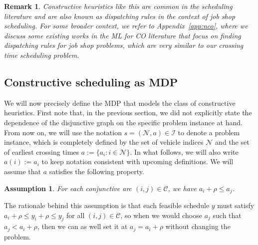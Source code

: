 \documentclass[a4paper]{report}
\theoremstyle{definition}
\theoremstyle{plain}
\newtheorem{assump}{Assumption}[chapter]
\newtheorem{remark}{Remark}[chapter]
\begin{document}
\begin{remark}
  Constructive heuristics like this are common in the scheduling literature and
  are also known as dispatching rules in the context of job shop scheduling. For
  some broader context, we refer to Appendix~\ref{app:nco}, where we discuss
  some existing works in the ML for CO literature that focus on finding
  dispatching rules for job shop problems, which are very similar to our
  crossing time scheduling problem.
\end{remark}

\subsection{Constructive scheduling as MDP}\label{sec:MDP}


We will now precisely define the MDP that models the class of constructive
heuristics.
First note that, in the previous section, we did not explicitly state the
dependence of the disjunctive graph on the specific problem instance at hand.
From now on, we will use the notation $s = (\mathcal{N}, a) \in \mathcal{I}$ to
denote a problem instance, which is completely defined by the set of vehicle
indices $\mathcal{N}$ and the set of earliest crossing times
$a := \{ a_i : i \in \mathcal{N} \}$. In what follows, we will also write
$a(i) := a_i$ to keep notation consistent with upcoming definitions.
%
We will assume that $a$ satisfies the following property.
\begin{assump}\label{assump:arrivals}
  For each conjunctive arc $(i, j) \in \mathcal{C}$, we have
  $a_i + \rho \leq a_j$.
\end{assump}
\noindent
The rationale behind this assumption is that each feasible schedule $y$ must
satisfy $a_i + \rho \leq y_i + \rho \leq y_j$ for all $(i,j) \in \mathcal{C}$,
so when we would choose $a_j$ such that $a_j < a_i + \rho$, then we can as well
set it at $a_j = a_i + \rho$ without changing the problem.
\end{document}
